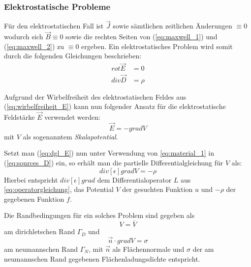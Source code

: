 \subsubsection{Elektrostatische Probleme}
\label{sec:electrostatic_problems}
Für den elektrostatischen Fall ist $\vec{J}$ sowie sämtlichen zeitlichen Änderungen $\equiv 0$ wodurch sich $\vec{B} \equiv 0$ sowie die rechten Seiten von (\ref{eq:maxwell_1}) und  (\ref{eq:maxwell_2}) zu $\equiv 0$ ergeben.\newline
Ein elektrostatisches Problem wird somit durch die folgenden Gleichungen beschrieben:
\begin{align}
\mathit{rot}\vec{E} &= 0 \label{eq:wirbelfreiheit_E}\\
\mathit{div}\vec{D} &= \rho \label{eq:sources_D}
\end{align}\newline

Aufgrund der Wirbelfreiheit des elektrostatischen Feldes aus (\ref{eq:wirbelfreiheit_E}) kann nun folgender Ansatz für die elektrostatische Feldstärke $\vec{E}$ verwendet werden:
\begin{equation}
\label{eq:dgl_E}
\vec{E} = -\mathit{grad}V
\end{equation}
mit $V$ als sogenanntem \textit{Skalapotential}.\newline

Setzt man (\ref{eq:dgl_E}) nun unter Verwendung von \ref{eq:material_1} in (\ref{eq:sources_D}) ein, so erhält man die partielle Differentialgleichung für $V$ als:
\begin{equation}
\mathit{div}[\epsilon]\mathit{grad}V = -\rho
\end{equation}
Hierbei entspricht $\mathit{div}[\epsilon]\mathit{grad}$ dem Differentialoperator $L$ aus \ref{eq:operatorgleichung}, das Potential $V$ der gesuchten Funktion $u$ und $-\rho$ der gegebenen Funktion $f$.\newline

Die Randbedingungen für ein solches Problem sind gegeben als
\begin{equation}
\label{eq:e-static_dirichlet_condition}
	V = \overline{V}
\end{equation}
am dirichletschen Rand $\Gamma_D$ und 
\begin{equation}
\label{eq:e-static_neumann_condition}
\vec{n}\cdot\mathit{grad}V = \sigma 
\end{equation}
am neumannschen Rand $\Gamma_N$, mit $\vec{n}$ als Flächennormale und $\sigma$ der am neumannschen Rand gegebenen Flächenladungsdichte entspricht.\newline

